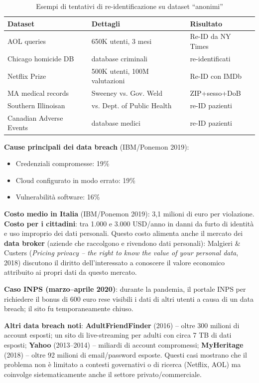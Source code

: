\documentclass[a4paper,11pt]{article}
\begin{document}
\begin{table}[h!]
\centering
\small
\begin{tabular}{lll}
\toprule
\textbf{Dataset} & \textbf{Dettagli} & \textbf{Risultato} \\
\midrule
AOL queries & 650K utenti, 3 mesi & Re-ID da NY Times \\
Chicago homicide DB & database criminali & re-identificati \\
Netflix Prize & 500K utenti, 100M valutazioni & Re-ID con IMDb \\
MA medical records & Sweeney vs. Gov. Weld & ZIP+sesso+DoB \\
Southern Illinoisan & vs. Dept. of Public Health & re-ID pazienti \\
Canadian Adverse Events & database medici & re-ID pazienti \\
\bottomrule
\end{tabular}
\caption{Esempi di tentativi di re-identificazione su dataset ``anonimi''}
\end{table}

\textbf{Cause principali dei data breach} (IBM/Ponemon 2019):
\begin{itemize}
  \item Credenziali compromesse: 19\%
  \item Cloud configurato in modo errato: 19\%
  \item Vulnerabilit\`{a} software: 16\%
\end{itemize}
\textbf{Costo medio in Italia} (IBM/Ponemon 2019): 3,1 milioni di euro per violazione. \textbf{Costo per i cittadini}: tra 1.000 e 3.000 USD/anno in danni da furto di identit\`{a} e uso improprio dei dati personali. Questo costo alimenta anche il mercato dei \textbf{data broker} (aziende che raccolgono e rivendono dati personali): Malgieri \& Custers (\emph{Pricing privacy -- the right to know the value of your personal data}, 2018) discutono il diritto dell'interessato a conoscere il valore economico attribuito ai propri dati da questo mercato.

\textbf{Caso INPS (marzo--aprile 2020)}: durante la pandemia, il portale INPS per richiedere il bonus di 600 euro rese visibili i dati di altri utenti a causa di un data breach; il sito fu temporaneamente chiuso.

\textbf{Altri data breach noti}: \textbf{AdultFriendFinder} (2016) -- oltre 300 milioni di account esposti; un sito di live-streaming per adulti con circa 7 TB di dati esposti; \textbf{Yahoo} (2013--2014) -- miliardi di account compromessi; \textbf{MyHeritage} (2018) -- oltre 92 milioni di email/password esposte. Questi casi mostrano che il problema non \`{e} limitato a contesti governativi o di ricerca (Netflix, AOL) ma coinvolge sistematicamente anche il settore privato/commerciale.
\end{document}
